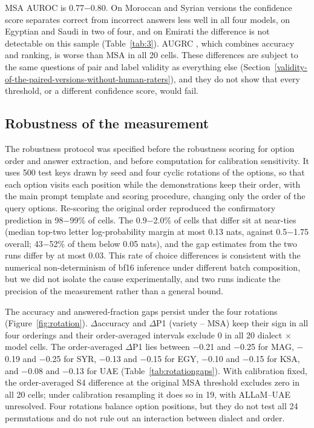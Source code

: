 \documentclass[applsci,article,submit,pdftex,oneauthor]{Definitions/mdpi}
\begin{document}
MSA AUROC is 0.77$-$0.80. On Moroccan and Syrian versions the confidence score separates correct from incorrect answers less well in all four models, on Egyptian and Saudi in two of four, and on Emirati the difference is not detectable on this sample (Table~\ref{tab:3}). AUGRC \cite{traub2024overcoming}, which combines accuracy and ranking, is worse than MSA in all 20 cells. These differences are subject to the same questions of pair and label validity as everything else (Section~\ref{validity-of-the-paired-versions-without-human-raters}), and they do not show that every threshold, or a different confidence score, would fail.

\hypertarget{robustness-of-the-measurement}{%
\subsection{Robustness of the measurement}\label{robustness-of-the-measurement}}

The robustness protocol was specified before the robustness scoring for option order and answer extraction, and before computation for calibration sensitivity. It uses 500 test keys drawn by seed and four cyclic rotations of the options, so that each option visits each position while the demonstrations keep their order, with the main prompt template and scoring procedure, changing only the order of the query options. Re-scoring the original order reproduced the confirmatory prediction in 98$-$99\% of cells. The 0.9$-$2.0\% of cells that differ sit at near-ties (median top-two letter log-probability margin at most 0.13 nats, against 0.5$-$1.75 overall; 43$-$52\% of them below 0.05 nats), and the gap estimates from the two runs differ by at most 0.03. This rate of choice differences is consistent with the numerical non-determinism of bf16 inference under different batch composition, but we did not isolate the cause experimentally, and two runs indicate the precision of the measurement rather than a general bound.

The accuracy and answered-fraction gaps persist under the four rotations (Figure~\ref{fig:rotation}). $\Delta$accuracy and $\Delta$P1 (variety -- MSA) keep their sign in all four orderings and their order-averaged intervals exclude 0 in all 20 dialect $\times$ model cells. The order-averaged $\Delta$P1 lies between $-$0.21 and $-$0.25 for MAG, $-$0.19 and $-$0.25 for SYR, $-$0.13 and $-$0.15 for EGY, $-$0.10 and $-$0.15 for KSA, and $-$0.08 and $-$0.13 for UAE (Table~\ref{tab:rotationgaps}). With calibration fixed, the order-averaged S4 difference at the original MSA threshold excludes zero in all 20 cells; under calibration resampling it does so in 19, with ALLaM--UAE unresolved. Four rotations balance option positions, but they do not test all 24 permutations and do not rule out an interaction between dialect and order.
\end{document}
